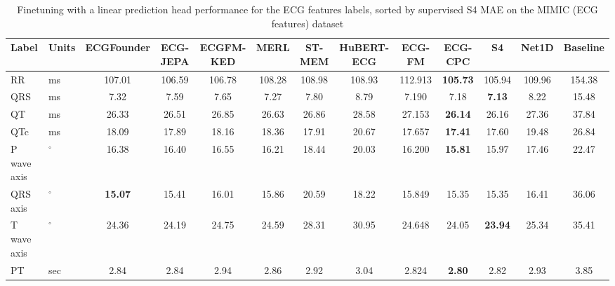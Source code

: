 \documentclass{article}
\begin{document}
                \begin{table}[htbp]
                    \centering
                    \tiny
                    \setlength{\tabcolsep}{2pt}
                    \caption{Finetuning with a linear prediction head performance for the ECG features labels, sorted by supervised S4 MAE on the MIMIC (ECG features) dataset}
                    \begin{tabular}{llccccccccccc}
                        \toprule
                        \textbf{Label} & \textbf{Units} & \textbf{ECGFounder} & \textbf{ECG-JEPA} & \textbf{ECGFM-KED} & \textbf{MERL} & \textbf{ST-MEM} & \textbf{HuBERT-ECG} & \textbf{ECG-FM} & \textbf{ECG-CPC} & \textbf{S4} & \textbf{Net1D} & \textbf{Baseline} \\
                        \midrule
                        RR & ms & 107.01 & 106.59 & 106.78 & 108.28 & 108.98 & 108.93 & 112.913 & \textbf{105.73} & 105.94 & 109.96 & 154.38 \\
                        QRS &  ms & 7.32 & 7.59 & 7.65 & 7.27 & 7.80 & 8.79 & 7.190 & 7.18 & \textbf{7.13} & 8.22 & 15.48 \\
                        QT & ms & 26.33 & 26.51 & 26.85 & 26.63 & 26.86 & 28.58 & 27.153 & \textbf{26.14} & 26.16 & 27.36 & 37.84 \\
                        QTc & ms & 18.09 & 17.89 & 18.16 & 18.36 & 17.91 & 20.67 & 17.657 & \textbf{17.41} & 17.60 & 19.48 & 26.84 \\
                        P wave axis & $^\circ$ & 16.38 & 16.40 & 16.55 & 16.21 & 18.44 & 20.03 & 16.200 & \textbf{15.81} & 15.97 & 17.46 & 22.47 \\
                        QRS axis & $^\circ$ & \textbf{15.07} & 15.41 & 16.01 & 15.86 & 20.59 & 18.22 & 15.849 & 15.35 & 15.35 & 16.41 & 36.06 \\
                        T wave axis & $^\circ$ & 24.36 & 24.19 & 24.75 & 24.59 & 28.31 & 30.95 & 24.648 & 24.05 & \textbf{23.94} & 25.34 & 35.41 \\
                        PT & sec & 2.84 & 2.84 & 2.94 & 2.86 & 2.92 & 3.04 & 2.824 & \textbf{2.80} & 2.82 & 2.93 & 3.85 \\
                        \bottomrule
                    \end{tabular}
                    \label{tab:results_overview_ecgfeatures}
                \end{table}
                
\end{document}
